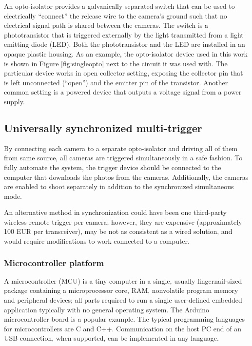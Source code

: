 An opto-isolator provides a galvanically separated switch that can be used to electrically ``connect'' the release wire to the camera's ground such that no electrical signal path is shared between the cameras.
The switch is a phototransistor that is triggered externally by the light transmitted from a light emitting diode (LED).
Both the phototransistor and the LED are installed in an opaque plastic housing.
As an example, the opto-isolator device used in this work is shown in Figure \ref{fig:singleopto} next to the circuit it was used with.
The particular device works in open collector setting, exposing the collector pin that is left unconnected (``open'') and the emitter pin of the transistor.
Another common setting is a powered device that outputs a voltage signal from a power supply.


\subsection{Universally synchronized multi-trigger} %

By connecting each camera to a separate opto-isolator and driving all of them from same source, all cameras are triggered simultaneously in a safe fashion.
To fully automate the system, the trigger device should be connected to the computer that downloads the photos from the cameras.
Additionally, the cameras are enabled to shoot separately in addition to the synchronized simultaneous mode.

An alternative method in synchronization could have been one third-party wireless remote trigger per camera;
however, they are expensive (approximately 100 EUR per transceiver), may be not as consistent as a wired solution, and would require modifications to work connected to a computer.

\subsubsection{Microcontroller platform}

A microcontroller (MCU) is a tiny computer in a single, usually fingernail-sized package containing a microprocessor core, RAM, nonvolatile program memory and peripheral devices; all parts required to run a single user-defined embedded application typically with no general operating system.
The Arduino microcontroller board is a popular example.
The typical programming languages for microcontrollers are C and C++.
Communication on the host PC end of an USB connection, when supported, can be implemented in any language.

